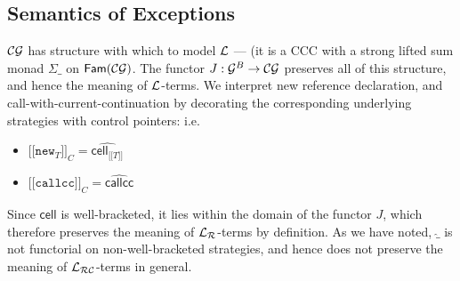 \documentclass{eptcs}
\def\[{\ensuremath{[ \! [}}
\def\]{\ensuremath{] \! ]}}
\def\G{{\cal{G}}}
\def\L{{\cal{L}}}
\newcommand{\CG}{{\cal{CG}}}
\newcommand{\callcc}{{\mathtt{callcc}}}
\newcommand{\Lr}{{\cal{L_R}}}
\newcommand{\Lc}{{\cal{L_{RC}}}}
\newcommand{\callc}{{\mathsf{callcc}}}
\newcommand{\new}{{\mathtt{new}}}
\newcommand{\cell}{{\mathsf{cell}}}
\newcommand{\Fam}{{\mathsf{Fam}}}
\begin{document}
{\subsection{Semantics of Exceptions}
$\CG$ has structure with which to  model $\L$ --- (it is a CCC with a strong lifted sum monad $\Sigma\_$ on $\Fam(\CG)$. The functor $J:\G^B \rightarrow \CG$ preserves all of this structure, and hence the meaning of $\L$-terms. We interpret new reference declaration, and  call-with-current-continuation by decorating the corresponding underlying strategies with control pointers: i.e.
\begin{itemize}
\item $\[\new_T\]_C = \widehat{\cell_{\[T\]}}$
\item $\[\callcc\]_C = \widehat{\callc}$ 
\end{itemize}  
Since $\cell$ is well-bracketed, it lies within the domain of the functor  $J$, which therefore preserves the meaning of $\Lr$-terms by definition. 
 As we have noted, $\widehat{\_}$ is not functorial on non-well-bracketed strategies, and hence does not preserve the meaning of $\Lc$-terms in general. 




}
\end{document}
